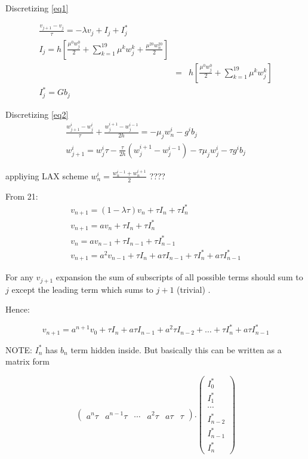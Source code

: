 \documentclass{ifacconf}
\begin{document}
Discretizing \ref{eq1}

\begin{eqnarray}
\frac{v_{j+1}-v_j}{\tau} = -\lambda v_j + I_j + I_j^{*} \\
I_j = h[\frac{\mu^0 w_j^0}{2} + \sum_{k=1}^{19} \mu^k w_j^k + \frac{\mu^{20} w_n^{20}}{2} ] \\
&=&  h[\frac{\mu^0 w_j^0}{2} + \sum_{k=1}^{19} \mu^k w_j^k ] \nonumber \\
I_j^{*} = Gb_j
\end{eqnarray}


Discretizing \ref{eq2}
\begin{eqnarray}
\frac{w_{j+1}^i-w_{j}^i}{\tau} + \frac{w_j^{i+1}-w_j^{i-1}}{2h} = -\mu_jw_n^i - g^ib_j \nonumber\\
w_{j+1}^i=w_{j}^i{\tau}-\frac{\tau}{2h}(w_j^{i+1}-w_j^{i-1})-\tau\mu_j w_j^i - \tau g^i b_j
\end{eqnarray}

appliying LAX scheme $w_n^i = \frac{w_n^{i-1} + w_n^{i+1}}{2}$ ????


From 21:
\begin{eqnarray}
v_{n+1} = (1-\lambda \tau)v_n + \tau I_n + \tau I_n^{*} \\
v_{n+1} = av_n + \tau I_n + \tau I_n^{*}\\
v_{n} = av_{n-1} + \tau I_{n-1} + \tau I_{n-1}^{*}\\
v_{n+1} = a^2v_{n-1} + \tau I_n + a\tau I_{n-1} + \tau I_{n}^{*} + a\tau I_{n-1}^{*} 
\end{eqnarray}


For any $v_{j+1}$ expansion the sum of subscripts of all possible terms should sum to $j$ except the leading term which sums to $j+1$ (trivial) .

Hence:

\begin{equation}
v_{n+1} = a^{n+1}v_0 + \tau I_n + a \tau I_{n-1} + a^2 \tau I_{n-2} + \ldots + \tau I_n^{*} + a\tau I_{n-1}^{*} 
\end{equation}


NOTE: $I_n^{*}$ has $b_n$ term hidden inside. But basically this can be written as a matrix form

\begin{equation}
\begin{pmatrix} a^{n}\tau & a^{n-1}\tau & \cdots & a^2\tau & a\tau& \tau \end{pmatrix} . \begin{pmatrix} I_0^{*} \\ I_1^{*} \\ \cdots \\ I_{n-2}^{*} \\ I_{n-1}^{*} \\ I_{n} ^{*}\end{pmatrix}
\end{equation}
\end{document}

